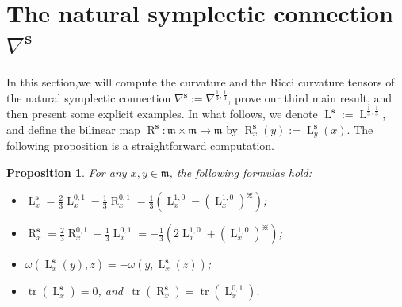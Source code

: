 \documentclass[preprint,12pt,1p]{elsarticle}
\theoremstyle{plain}
\newtheorem{proposition}[theorem]{Proposition}
\theoremstyle{definition}
\newcommand{\n}{\nabla}
\newcommand{\ns}{\n^\mathbf{s}}
\newcommand{\tr}{\operatorname{tr}}
\newcommand{\m}{\mathfrak{m}}
\newcommand{\la}{\operatorname{L}^{0,1}}
\newcommand{\ra}{\operatorname{R}^{0,1}}
\newcommand{\ls}{\operatorname{L}^\mathbf{s}}
\newcommand{\rs}{\operatorname{R}^\mathbf{s}}
\newcommand{\lm}{\operatorname{L}^{1,0}}
\newcommand{\LS}{\operatorname{L}}
\numberwithin{equation}{section}
\newcommand{\aj}{\divideontimes}
\begin{document}
\section{The natural symplectic connection $\ns$}
In this section,we will compute the curvature and the Ricci curvature tensors of the natural symplectic connection $\ns:=\n^{\frac{1}{3},\frac{1}{3}}$, prove our third main result, and then present some explicit examples. In what follows, we denote $\ls:=\LS^{\frac{1}{3},\frac{1}{3}}$, and define the bilinear map $\rs:\mathfrak{m}\times\m\to\mathfrak{m}$ by $\rs_x(y):=\ls_y(x)$. The following proposition is a straightforward computation.
\begin{proposition}\label{L,R}
For any $x,y\in\mathfrak{m}$, the following formulas hold:
\begin{itemize}
\item[$1.$] $\ls_x=\frac{2}{3}\la_x-\frac{1}{3}\ra_x=\frac{1}{3}\left(\lm_x-\left(\lm_x\right)^\aj\right)$;
\item[$2.$] $\rs_x=\frac{2}{3}\ra_x-\frac{1}{3}\la_x=-\frac{1}{3}\left(2\lm_x+\left(\lm_x\right)^\aj\right)$;
\item[$3.$] $\omega\left(\ls_x(y),z\right)=-\omega\left(y,\ls_x(z)\right)$;
\item[$4.$] $\tr(\ls_x)=0$, and $\,\tr(\rs_x)=\tr(\la_x)$.
\end{itemize}
\end{proposition}
\end{document}
